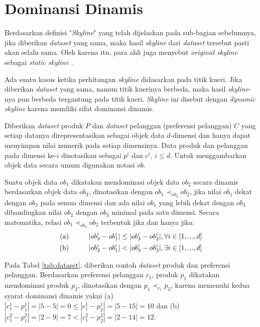 \section{Dominansi Dinamis}

\tab Berdasarkan definisi "\textit{Skyline}" yang telah dijelaskan pada sub-bagian sebelumnya, jika diberikan \textit{dataset} yang sama, maka hasil \textit{skyline} dari \textit{dataset} tersebut pasti akan selalu sama. Oleh karena itu, para ahli juga menyebut \textit{original skyline} sebagai \textit{static skyline} \cite{dynamic-skyline-2}.

Ada suatu kasus ketika perhitungan \textit{skyline} didasarkan pada titik kueri. Jika diberikan \textit{dataset} yang sama, namun titik kuerinya berbeda, maka hasil \textit{skyline}-nya pun berbeda tergantung pada titik kueri. \textit{Skyline} ini disebut dengan \textit{dynamic skyline} karena memiliki sifat dominansi dinamis. 

Diberikan \textit{dataset} produk $P$ dan \textit{dataset} pelanggan (preferensi pelanggan) $C$ yang setiap datanya direpresentasikan sebagai objek data $d$-dimensi dan hanya dapat menyimpan nilai numerik pada setiap dimensinya. Data produk dan pelanggan pada dimensi ke-$i$ dinotasikan sebagai $p^i$ dan $c^i$, $i \leq d$. Untuk menggambarkan objek data secara umum digunakan notasi $ob$.

\pagebreak
Suatu objek data $ob_1$ dikatakan mendominasi objek data $ob_2$ secara dinamis berdasarkan objek data $ob_3$, dinotasikan dengan $ob_1 \prec_{ob_3} ob_2$, jika nilai $ob_1$ dekat dengan $ob_3$ pada semua dimensi dan ada nilai $ob_1$ yang lebih dekat dengan $ob_3$ dibandingkan nilai $ob_2$ dengan $ob_3$ minimal pada satu dimensi. Secara matematika, relasi $ob_1 \prec_{ob_3} ob_2$ terbentuk jika dan hanya jika:
\begin{equation}\label{eq:syarat-dominansi-dinamis}
\begin{split}
\text{(a)} \hspace*{1cm} |ob_3^i - ob_1^i| \leq |ob_3^i - ob_2^i|, \forall i \in [1, ..., d] \\
\text{(b)} \hspace*{1cm} |ob_3^i - ob_1^i| < |ob_3^i - ob_2^i|, \exists i \in [1, ..., d]
\end{split}
\end{equation}

Pada Tabel \ref{tab:dataset}, diberikan contoh \textit{dataset} produk dan preferensi pelanggan. Berdasarkan preferensi pelanggan $c_1$, produk $p_1$ dikatakan mendominasi produk $p_2$, dinotasikan dengan $p_1 \prec_{c_1} p_2$, karena memenuhi kedua syarat dominansi dinamis yakni (a) $|c_1^1 - p_1^1| = |5-5| = 0 \leq |c_1^1 - p_2^1| = |5-15| = 10$ dan (b) $|c_1^2 - p_1^2| = |2-9| = 7 < |c_1^2 - p_2^2| = |2-14| = 12$.

